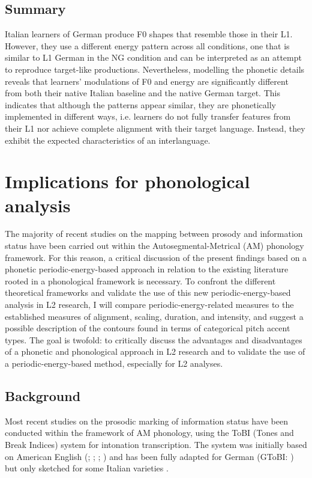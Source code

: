 \subsection{Summary}
\label{sec:2.7.4}
Italian learners of German produce F0 shapes that resemble those in their L1. However, they use a different energy pattern across all conditions, one that is similar to L1 German in the NG condition and can be interpreted as an attempt to reproduce target-like productions. Nevertheless, modelling the phonetic details reveals that learners’ modulations of F0 and energy are significantly different from both their native Italian baseline and the native German target. This indicates that although the patterns appear similar, they are phonetically implemented in different ways, i.e. learners do not fully transfer features from their L1 nor achieve complete alignment with their target language. Instead, they exhibit the expected characteristics of an interlanguage.

\section{Implications for phonological analysis}
\label{sec:2.8}
The majority of recent studies on the mapping between prosody and information status have been carried out within the Autosegmental-Metrical (AM) phonology framework. For this reason, a critical discussion of the present findings based on a phonetic periodic-energy-based approach in relation to the existing literature rooted in a phonological framework is necessary. To confront the different theoretical frameworks and validate the use of this new periodic-energy-based analysis in L2 research, I will compare periodic-energy-related measures to the established measures of alignment, scaling, duration, and intensity, and suggest a possible description of the contours found in terms of categorical pitch accent types. The goal is twofold: to critically discuss the advantages and disadvantages of a phonetic and phonological approach in L2 research and to validate the use of a periodic-energy-based method, especially for L2 analyses.

\subsection{Background}
\label{sec:2.8.1}
Most recent studies on the prosodic marking of information status have been conducted within the framework of AM phonology, using the ToBI (Tones and Break Indices) system for intonation transcription. The system was initially based on American English (\citealt{BeckmanPierrehumbert1986}; \citealt{BeckmanAyers1997}; \citealt{Beckman2005}; \citealt{Shattuck-HufnagelBrugos2006}) and has been fully adapted for German (GToBI: \citealt{GriceEtAl2005}) but only sketched for some Italian varieties \citep{GriceEtAl2005}.

